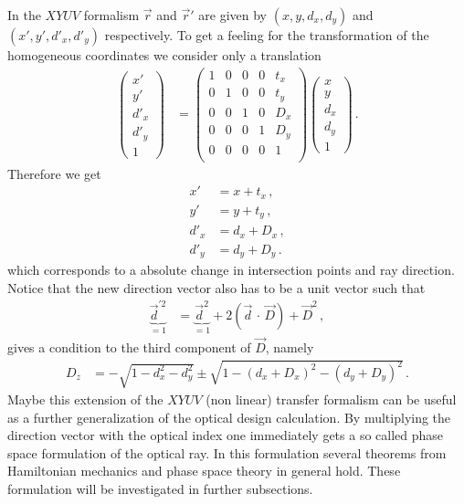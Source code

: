 \documentclass[12pt,a4paper,twoside,openright,BCOR10mm,headsepline,titlepage,abstracton,chapterprefix,final]{scrreprt}
\newcommand{\scpm}[2]{(#1\,\cdot\,#2)}
\begin{document}
In the $XYUV$ formalism $\vec{r}$ and $\vec{r}'$ are given by $(x,y,d_x,d_y)$ and $(x',y',{d'}_x,{d'}_y)$
respectively. To get a feeling for the transformation of the homogeneous coordinates we consider only
a translation
\begin{align}
 \begin{pmatrix} x' \\ y' \\ {d'}_x \\ {d'}_y \\ 1 \end{pmatrix} &=
 \begin{pmatrix} 1 & 0 & 0 & 0 & t_x \\
                 0 & 1 & 0 & 0 & t_y \\
                 0 & 0 & 1 & 0 & D_x \\
                 0 & 0 & 0 & 1 & D_y \\
                 0 & 0 & 0 & 0 & 1 \\
 \end{pmatrix}
 \begin{pmatrix} x \\ y \\ d_x \\ d_y \\ 1 \end{pmatrix}\,.
\end{align}
Therefore we get
\begin{subequations}
\begin{align}
 x' &= x + t_x\,,\\
 y' &= y + t_y\,,\\
 {d'}_x &= d_x + D_x\,,\\
 {d'}_y &= d_y + D_y\,.
\end{align}
\end{subequations}
which corresponds to a absolute change in intersection points and ray direction.
Notice that the new direction vector also has to be a unit vector such that
\begin{align}
 \underbrace{{\vec{d}}^{\prime 2}}_{=1} &= \underbrace{\vec{d}^2}_{=1} + 2 \scpm{\vec{d}}{\vec{D}} + \vec{D}^2\,,
\end{align}
gives a condition to the third component of $\vec{D}$, namely
\begin{align}
 D_z &= -\sqrt{1 - d_x^2 - d_y^2} \pm \sqrt{1 - (d_x + D_x)^2 - (d_y + D_y)^2}\,.
\end{align}
Maybe this extension of the $XYUV$ (non linear) transfer formalism can be useful as a further generalization of
the optical design calculation. By multiplying the direction vector with the optical index one immediately gets
a so called phase space formulation of the optical ray. In this formulation several theorems from Hamiltonian
mechanics and phase space theory in general hold. These formulation will be investigated in further subsections.
\end{document}
